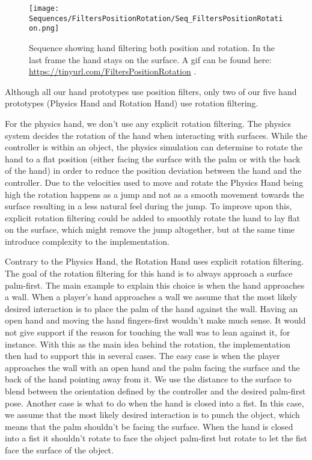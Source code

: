 \begin{figure}[H]
\centering
\texttt{[image: Sequences/FiltersPositionRotation/Seq\_FiltersPositionRotation.png]}
\caption{Sequence showing hand filtering both position and rotation. In the last frame the hand stays on the surface. A gif can be found here: \url{https://tinyurl.com/FiltersPositionRotation} .}
\label{fig:filtersPositionRotation}
\end{figure}

Although all our hand prototypes use position filters, only two of our five hand prototypes (Physics Hand and Rotation Hand) use rotation filtering.

For the physics hand, we don't use any explicit rotation filtering. The physics system decides the rotation of the hand when interacting with surfaces. While the controller is within an object, the physics simulation can determine to rotate the hand to a flat position (either facing the surface with the palm or with the back of the hand) in order to reduce the position deviation between the hand and the controller. Due to the velocities used to move and rotate the Physics Hand being high the rotation happens as a jump and not as a smooth movement towards the surface resulting in a less natural feel during the jump. To improve upon this, explicit rotation filtering could be added to smoothly rotate the hand to lay flat on the surface, which might remove the jump altogether, but at the same time introduce complexity to the implementation.

Contrary to the Physics Hand, the Rotation Hand uses explicit rotation filtering. The goal of the rotation filtering for this hand is to always approach a surface palm-first. The main example to explain this choice is when the hand approaches a wall. When a player's hand approaches a wall we assume that the most likely desired interaction is to place the palm of the hand against the wall. Having an open hand and moving the hand fingers-first wouldn't make much sense. It would not give support if the reason for touching the wall was to lean against it, for instance. With this as the main idea behind the rotation, the implementation then had to support this in several cases. The easy case is when the player approaches the wall with an open hand and the palm facing the surface and the back of the hand pointing away from it. We use the distance to the surface to blend between the orientation defined by the controller and the desired palm-first pose. Another case is what to do when the hand is closed into a fist. In this case, we assume that the most likely desired interaction is to punch the object, which means that the palm shouldn't be facing the surface. When the hand is closed into a fist it shouldn't rotate to face the object palm-first but rotate to let the fist face the surface of the object.

